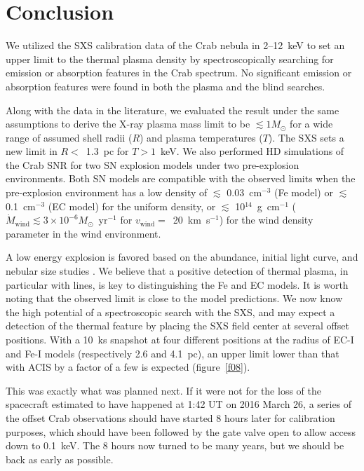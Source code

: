 \documentclass[]{pasj01}
\begin{document}
\section{Conclusion}\label{s5}
We utilized the SXS calibration data of the Crab nebula in 2--12~keV to set an upper
limit to the thermal plasma density by spectroscopically searching for emission or
absorption features in the Crab spectrum. No significant emission or absorption features
were found in both the plasma and the blind searches.

Along with the data in the literature, we evaluated the result under the same
assumptions to derive the X-ray plasma mass limit to be $\lesssim 1 M_{\odot}$ for a
wide range of assumed shell radii ($R$) and plasma temperatures ($T$). The SXS sets
a new limit in $R<$~1.3~pc for $T>1$~keV. We also performed HD simulations of the
Crab SNR for two SN explosion models under two pre-explosion environments. Both SN models
are compatible with the observed limits when the pre-explosion environment has a low
density of $\lesssim$ 0.03~cm$^{-3}$ (Fe model) or $\lesssim$ 0.1~cm$^{-3}$ (EC model)
for the uniform density, or $\lesssim$ 10$^{14}$~g~cm$^{-1}$ ($\dot{M}_{\mathrm{wind}}
\lesssim 3 \times 10^{-6} M_{\odot}$~yr$^{-1}$ for $v_{\mathrm{wind}}=$~20~km~s$^{-1}$)
for the wind density parameter in the wind environment.

A low energy explosion is favored based on the abundance, initial light curve, and
nebular size studies \citep{macalpine08,moriya14,yang15}. We believe that a
positive detection of thermal plasma, in particular with lines, is key to
distinguishing the Fe and EC models. It is worth noting that the observed limit is close
to the model predictions. We now know the high potential of a spectroscopic search with
the SXS, and may expect a detection of the thermal feature by placing the SXS field
center at several offset positions. With a 10~ks snapshot at four different positions at
the radius of EC-I and Fe-I models (respectively 2.6 and 4.1~pc), an upper limit lower
than that with ACIS by a factor of a few is expected (figure~\ref{f08}).

This was exactly what was planned next. If it were not for the loss of the spacecraft
estimated to have happened at 1:42 UT on 2016 March 26, a series of the offset Crab
observations should have started 8 hours later for calibration purposes, which should
have been followed by the gate valve open to allow access down to 0.1~keV. The 8 hours
now turned to be many years, but we should be back as early as possible.
\end{document}
